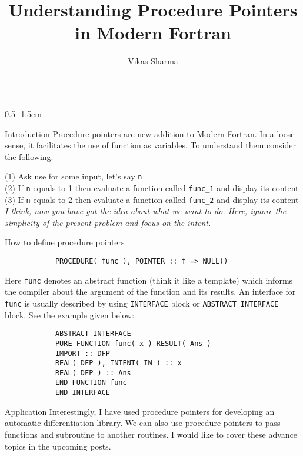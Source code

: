 \documentclass{uioposter}
\title{Understanding Procedure Pointers in Modern Fortran}
\author
{%
    Vikas Sharma \inst{1}
}
\institute
{
    \inst{1} Civil Engineering Department \\
    IIT Bombay, Mumbai, India
}
\begin{document}
\begin{columns}[onlytextwidth]


\begin{column}{0.5\textwidth - 1.5cm}
    \begin{block}{Introduction}
	Procedure pointers are new addition to Modern Fortran. In a loose sense, it facilitates the use of function as variables. To understand them consider the following.

		(1) Ask use for some input, let's say \verb|n|
		\\
		(2) If \verb|n| equals to 1 then evaluate a function called \verb|func_1|
		and display its content
		\\
		(3) If \verb|n| equals to 2 then evaluate a function called \verb|func_2|
		and display its content
		\\
		\textit{I think, now you have got the idea about what we want to do. Here,
		ignore the simplicity of the present problem and focus on the intent.}
    \end{block}

	\begin{block}{How to define procedure pointers}
		\begin{verbatim}
			PROCEDURE( func ), POINTER :: f => NULL()
		\end{verbatim}

		Here \verb|func| denotes an abstract function (think it like a template) which informs the compiler about  the argument of the function and its results. An interface for \verb|func| is usually described by using \verb|INTERFACE| block or \verb|ABSTRACT INTERFACE| block. See the example given below:

		\begin{verbatim}
			ABSTRACT INTERFACE
			PURE FUNCTION func( x ) RESULT( Ans )
			IMPORT :: DFP
			REAL( DFP ), INTENT( IN ) :: x
			REAL( DFP ) :: Ans
			END FUNCTION func
			END INTERFACE
		\end{verbatim}
	\end{block}

\begin{block}{Application}
	Interestingly, I have used procedure pointers for developing an automatic differentiation library. We can also use procedure pointers to pass functions and subroutine to another routines. I would like to cover these advance topics in the upcoming posts.
\end{block}



\end{column}
\end{columns}
\end{document}
